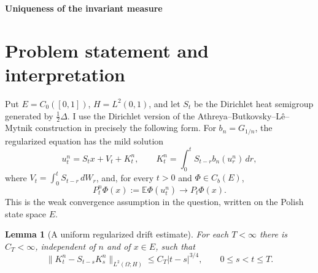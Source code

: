 \documentclass[12pt]{article}
\newtheorem{lemma}{Lemma}
\newcommand{\E}{\mathbb E}
\newcommand{\1}{\mathbf 1}
\begin{document}
\begin{center}
{\bf Uniqueness of the invariant measure}
\end{center}

\section*{Problem statement and interpretation}

Put \(E=C_0([0,1])\), \(H=L^2(0,1)\), and let \(S_t\) be the Dirichlet heat
semigroup generated by \(\frac12\Delta\).  I use the Dirichlet version of the
Athreya--Butkovsky--L\^e--Mytnik construction in precisely the following
form.  For \(b_n=G_{1/n}\), the regularized equation has the mild solution
\[
  u_t^n=S_t x+V_t+K_t^n,\qquad
  K_t^n=\int_0^tS_{t-r}b_n(u_r^n)\,dr,
\]
where \(V_t=\int_0^tS_{t-r}\,dW_r\), and, for every \(t>0\) and
\(\Phi\in C_b(E)\),
\[
        P_t^n\Phi(x):=\E\Phi(u_t^n)\longrightarrow P_t\Phi(x).
        \tag{1}
\]
This is the weak convergence assumption in the question, written on the
Polish state space \(E\).

\begin{lemma}[A uniform regularized drift estimate]\label{lem:Hestimate}
For each \(T<\infty\) there is \(C_T<\infty\), independent of \(n\) and of
\(x\in E\), such that
\[
 \|K_t^n-S_{t-s}K_s^n\|_{L^2(\Omega;H)}
      \le C_T |t-s|^{3/4},\qquad 0\le s<t\le T .             \tag{2}
\]
\end{lemma}
\end{document}
